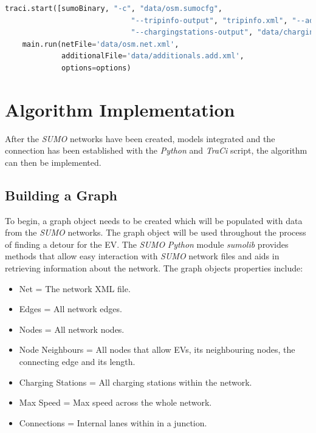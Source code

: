 \documentclass[11pt]{report}
\begin{document}
\begin{lstlisting}[language=Python, caption=TraCi simulation connection, label={lst:3}]
    traci.start([sumoBinary, "-c", "data/osm.sumocfg",
                             "--tripinfo-output", "tripinfo.xml", "--additional-files", "data/additionals.add.xml",
                             "--chargingstations-output", "data/chargingstations.xml"])
    main.run(netFile='data/osm.net.xml',
             additionalFile='data/additionals.add.xml',
             options=options)
\end{lstlisting}

\section{Algorithm Implementation}

After the \emph{SUMO} networks have been created, models integrated and the connection has been established with the \emph{Python} and \emph{TraCi} script, the algorithm can then be implemented. 

\subsection{Building a Graph}

To begin, a graph object needs to be created which will be populated with data from the \emph{SUMO} networks. The graph object will be used throughout the process of finding a detour for the EV. The \emph{SUMO} \emph{Python} module \emph{sumolib} provides methods that allow easy interaction with \emph{SUMO} network files and aids in retrieving information about the network. The graph objects properties include:

\begin{itemize}
  \item Net = The network XML file.
  \item Edges = All network edges.
  \item Nodes = All network nodes.
  \item Node Neighbours = All nodes that allow EVs, its neighbouring nodes, the connecting edge and its length.
  \item Charging Stations = All charging stations within the network.
  \item Max Speed = Max speed across the whole network.
  \item Connections = Internal lanes within in a junction.
\end{itemize}
\end{document}

